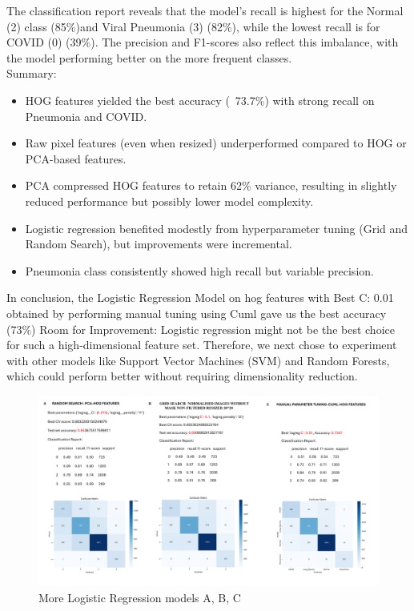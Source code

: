 \documentclass{article}
\begin{document}
The classification report reveals that the model's recall is highest for the Normal (2) class (85\%)and Viral Pneumonia (3) (82\%), while the lowest recall is for COVID (0) (39\%). The precision and F1-scores also reflect this imbalance, with the model performing better on the more frequent classes.
\\
Summary:
\begin{itemize}
    \item HOG features yielded the best accuracy (~73.7\%) with strong recall on Pneumonia and COVID.
    \item Raw pixel features (even when resized) underperformed compared to HOG or PCA-based features.
    \item PCA compressed HOG features to retain 62\% variance, resulting in slightly reduced performance but possibly lower model complexity.
    \item Logistic regression benefited modestly from hyperparameter tuning (Grid and Random Search), but improvements were incremental.
    \item Pneumonia class consistently showed high recall but variable precision.
\end{itemize}
In conclusion, the Logistic Regression Model on hog features with Best C: 0.01 obtained by performing manual tuning using Cuml gave us the best accuracy (73\%)
Room for Improvement: Logistic regression might not be the best choice for such a high-dimensional feature set. Therefore, we next chose to experiment with other models like Support Vector Machines (SVM) and Random Forests, which could perform better without requiring dimensionality reduction.


\begin{figure}[H]
    \centering
    \includegraphics[width=1.0\linewidth]{logreg2,a,b,c.png}
    \caption{More Logistic Regression models A, B, C}
    \label{fig:Logistic_Regression_logreg2}
\end{figure}
\end{document}
